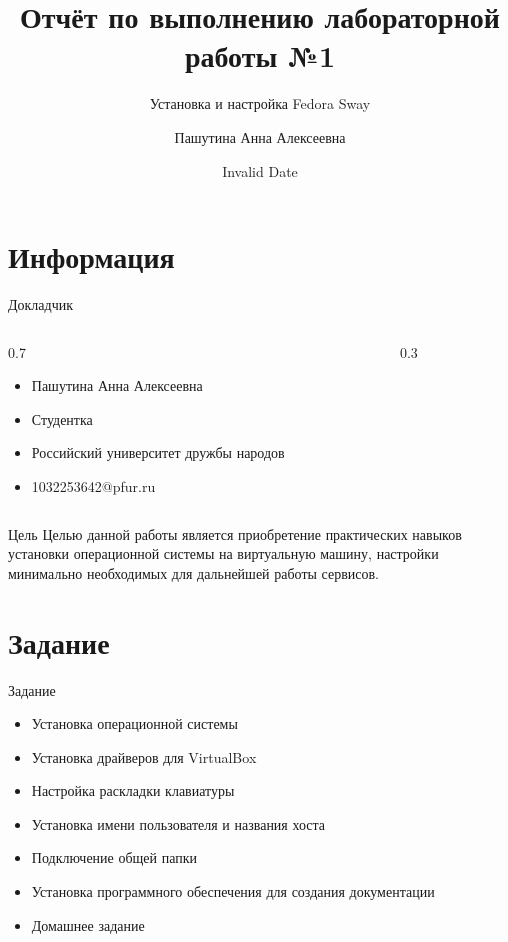 \documentclass[
  ignorenonframetext,
  aspectratio=169,
  russian,
]{beamer}
\title{Отчёт по выполнению лабораторной работы №1}
\subtitle{Установка и настройка Fedora Sway}
\author{Пашутина Анна Алексеевна}
\date{Invalid Date}
\institute{Российский университет дружбы народов, Москва, Россия}
\providecommand{\tightlist}{%
  \setlength{\itemsep}{0pt}\setlength{\parskip}{0pt}}\usepackage{longtable,booktabs,array}
\begin{document}
\frame{\titlepage}


\section{Информация}\label{ux438ux43dux444ux43eux440ux43cux430ux446ux438ux44f}

\begin{frame}{Докладчик}
\label{ux434ux43eux43aux43bux430ux434ux447ux438ux43a}
\begin{columns}[c]
\begin{column}{0.7\linewidth}
\begin{itemize}[<+->]
\tightlist
\item
  Пашутина Анна Алексеевна
\item
  Студентка
\item
  Российский университет дружбы народов
\item
  1032253642@pfur.ru
\end{itemize}
\end{column}

\begin{column}{0.3\linewidth}
\end{column}
\end{columns}
\end{frame}

\begin{frame}{Цель}
\label{ux446ux435ux43bux44c}
Целью данной работы является приобретение практических навыков установки
операционной системы на виртуальную машину, настройки минимально
необходимых для дальнейшей работы сервисов.
\end{frame}

\section{Задание}\label{ux437ux430ux434ux430ux43dux438ux435}

\begin{frame}{Задание}
\begin{itemize}[<+->]
\tightlist
\item
  Установка операционной системы
\item
  Установка драйверов для VirtualBox
\item
  Настройка раскладки клавиатуры
\item
  Установка имени пользователя и названия хоста
\item
  Подключение общей папки
\item
  Установка программного обеспечения для создания документации
\item
  Домашнее задание
\end{itemize}
\end{frame}
\end{document}
